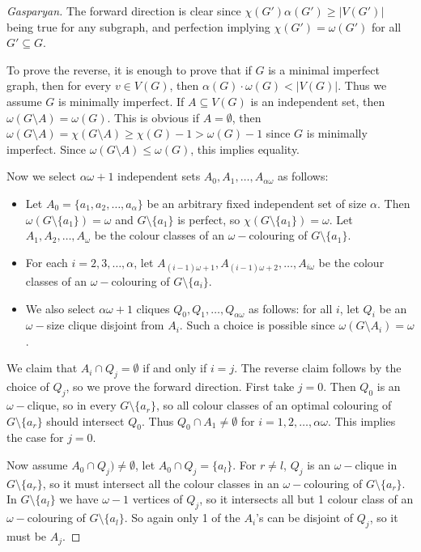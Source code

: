 \documentclass[12pt, a4paper]{book}
\theoremstyle{nonumberplain}
\newtheorem{proof}{Proof}
\begin{document}
\begin{proof}[Gasparyan]
    The forward direction is clear since $\chi(G')\alpha(G')\geq|V(G')|$ being true for any subgraph, and perfection implying $\chi(G')=\omega(G')$ for all $G'\subseteq G$.

    To prove the reverse, it is enough to prove that if $G$ is a minimal imperfect graph, then for every $v\in V(G)$, then $\alpha(G)\cdot\omega(G)<|V(G)|$.
    Thus we assume $G$ is minimally imperfect.
    If $A\subseteq V(G)$ is an independent set, then $\omega(G\setminus A)=\omega(G)$.
    This is obvious if $A=\emptyset$, then $\omega(G\setminus A)=\chi(G\setminus A)\geq\chi(G)-1>\omega(G)-1$ since $G$ is minimally imperfect.
    Since $\omega(G\setminus A)\leq\omega(G)$, this implies equality.

    Now we select $\alpha\omega+1$ independent sets $A_0,A_1,\ldots,A_{\alpha\omega}$ as follows:
    \begin{itemize}[nolistsep]
        \item Let $A_0=\{a_1,a_2,\ldots,a_{\alpha}\}$ be an arbitrary fixed independent set of size $\alpha$.
            Then $\omega(G\setminus\{a_1\})=\omega$ and $G\setminus\{a_1\}$ is perfect, so $\chi(G\setminus\{a_1\})=\omega$.
            Let $A_1,A_2,\ldots,A_\omega$ be the colour classes of an $\omega-$colouring of $G\setminus\{a_1\}$.
        \item For each $i=2,3,\ldots,\alpha$, let $A_{(i-1)\omega+1},A_{(i-1)\omega+2},\ldots,A_{i\omega}$ be the colour classes of an $\omega-$colouring of $G\setminus\{a_i\}$.
        \item We also select $\alpha\omega+1$ cliques $Q_0,Q_1,\ldots,Q_{\alpha\omega}$ as follows: for all $i$, let $Q_i$ be an $\omega-$size clique disjoint from $A_i$.
            Such a choice is possible since $\omega(G\setminus A_i)=\omega$.
    \end{itemize}
    We claim that $A_i\cap Q_j=\emptyset$ if and only if $i=j$.
    The reverse claim follows by the choice of $Q_j$, so we prove the forward direction.
    First take $j=0$.
    Then $Q_0$ is an $\omega-$clique, so in every $G\setminus\{a_r\}$, so all colour classes of an optimal colouring of $G\setminus\{a_r\}$ should intersect $Q_0$.
    Thus $Q_0\cap A_1\neq\emptyset$ for $i=1,2,\ldots,\alpha\omega$.
    This implies the case for $j=0$.

    Now assume $A_0\cap Q_j)\neq\emptyset$, let $A_0\cap Q_j=\{a_l\}$.
    For $r\neq l$, $Q_j$ is an $\omega-$clique in $G\setminus\{a_r\}$, so it must intersect all the colour classes in an $\omega-$colouring of $G\setminus\{a_r\}$.
    In $G\setminus\{a_l\}$ we have $\omega-1$ vertices of $Q_j$, so it intersects all but 1 colour class of an $\omega-$colouring of $G\setminus\{a_l\}$.
    So again only 1 of the $A_i$'s can be disjoint of $Q_j$, so it must be $A_j$.


\end{proof}
\end{document}
